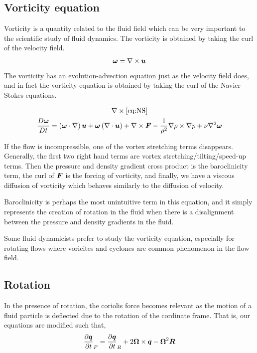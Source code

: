 \documentclass{article}
\begin{document}
\subsection{Vorticity equation}

Vorticity is a quantity related to the fluid field which can be very important
to the scientific study of fluid dynamics. The vorticity is obtained by taking
the curl of the velocity field. 
\begin{gather*}
    \boldsymbol{\omega} = \nabla \times \boldsymbol{u}
\end{gather*}
The vorticity has an evolution-advection equation just as the velocity field
does, and in fact the vorticity equation is obtained by taking the curl of the
Navier-Stokes equations.

\begin{gather*}
    \nabla\times\eqref{eq:NS}\\
    \frac{D \boldsymbol{\omega}}{D t} =  \left(\boldsymbol{\omega}\cdot\nabla\right)\boldsymbol{u} +
    \boldsymbol{\omega}\left(\nabla\cdot\boldsymbol{u}\right) + \nabla\times\boldsymbol{F} -
    \frac{1}{\rho^2}\nabla\rho\times\nabla p + 
    \nu\nabla^2\boldsymbol{\omega} 
\end{gather*}

If the flow is incompressible, one of the vortex stretching terms disappears.
Generally, the first two right hand terms are vortex stretching/tilting/speed-up
terms. Then the pressure and density gradient cross product is the baroclinicity
term, the curl of $\boldsymbol{F}$ is the forcing of vorticity, and finally, we have a
viscous diffusion of vorticity which behaves similarly to the diffusion of
velocity. 


Baroclinicity is perhaps the most unintuitive term in this equation, and it
simply represents the creation of rotation in the fluid when there is a
disalignment between the pressure and density gradients in the fluid. 

Some fluid dynamicists prefer to study the vorticity equation, especially for
rotating flows where voricites and cyclones are common phenomenon in the flow
field. 

\subsection{Rotation}

In the presence of rotation, the coriolis force becomes relevant as the motion
of a fluid particle is deflected due to the rotation of the cordinate frame.
That is, our equations are modified such that, 
\begin{gather*}
    \frac{\partial \boldsymbol{q}}{\partial t}_F = \frac{\partial \boldsymbol{q}}{\partial t}_R + 2\boldsymbol{\Omega}\times \boldsymbol{q} -
    \boldsymbol{\Omega}^2\boldsymbol{R}
\end{gather*}
\end{document}
